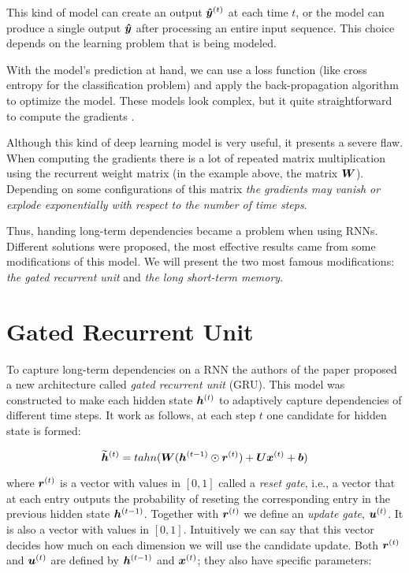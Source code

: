 This kind of model can create an output $\bm{\hat{y}}^{(t)}$ at each time $t$, or the model can produce a single output $\bm{\hat{y}}$ after processing an entire input sequence. This choice depends on the learning problem that is being modeled.


With the model's prediction at hand, we can use a loss function (like cross entropy for the classification problem) and apply the back-propagation algorithm to optimize the model. These models look complex, but it quite straightforward to compute the gradients \cite[p.~374]{DeepLearningbook}.

Although this kind of deep learning model is very useful, it presents a severe flaw. When computing the gradients there is a lot of repeated matrix multiplication using the recurrent weight matrix (in the example above, the matrix $\bm{W}$). Depending on some configurations of this matrix \textit{the gradients may vanish or explode exponentially with respect to the number of time steps}.

Thus, handing long-term dependencies became a problem when using RNNs. Different solutions were proposed, the most effective results came from some modifications of this model. We will present the two most famous modifications: \textit{the gated recurrent unit} and \textit{the long short-term memory}. 


\section{Gated Recurrent Unit}
\label{sec:GRU}

To capture long-term dependencies on a RNN  the authors of the paper \cite{ChungGCB14}  proposed a new architecture called \textit{gated recurrent unit} (GRU). This model was constructed to make each hidden state  $\bm{h}^{(t)}$ to adaptively capture dependencies of different time steps. It work as follows, at each step $t$ one candidate for hidden state is formed:

\begin{equation}
\bm{\widetilde{h}}^{(t)} = tahn(\bm{W} (\bm{h}^{(t-1)} \odot  \bm{r}^{(t)}) + \bm{U} \bm{x}^{(t)} + \bm{b})
\end{equation}

where $\bm{r}^{(t)}$ is a vector with values in $[0, 1]$ called a \textit{reset gate}, i.e.,  a vector that at each entry outputs the probability of reseting the  corresponding entry in the previous hidden state $\bm{h}^{(t-1)}$. Together with $\bm{r}^{(t)}$ we define an \textit{update gate}, $\bm{u}^{(t)}$. It is also a vector with values in $[0, 1]$. Intuitively we can say that this vector decides how much on each dimension we will use the candidate update. Both $\bm{r}^{(t)}$ and $\bm{u}^{(t)}$ are defined by $\bm{h}^{(t-1)}$ and $\bm{x}^{(t)}$; they also have specific parameters:

